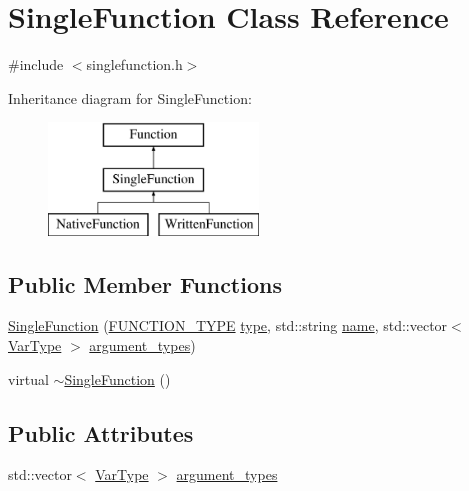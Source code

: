 \hypertarget{classSingleFunction}{}\section{Single\+Function Class Reference}
\label{classSingleFunction}


{\ttfamily \#include $<$singlefunction.\+h$>$}

Inheritance diagram for Single\+Function\+:\begin{figure}[H]
\begin{center}
\leavevmode
\includegraphics[height=3.000000cm]{classSingleFunction}
\end{center}
\end{figure}
\subsection*{Public Member Functions}
\begin{DoxyCompactItemize}
\item 
\hyperlink{classSingleFunction_a8c6cc400a8f83f317fa62de6886fde40}{Single\+Function} (\hyperlink{statics_8h_a025d9866e39f51183a23b3e2165f0e77}{F\+U\+N\+C\+T\+I\+O\+N\+\_\+\+T\+Y\+PE} \hyperlink{classFunction_a07d7969dbcf44a6a066c6e042a02983d}{type}, std\+::string \hyperlink{classFunction_a161d1ceb4f67f3222caf429fea7b71f1}{name}, std\+::vector$<$ \hyperlink{classVarType}{Var\+Type} $>$ \hyperlink{classSingleFunction_a345cc7c6a42587a62495688af6644a26}{argument\+\_\+types})
\item 
virtual \hyperlink{classSingleFunction_ae414926a60c49b4039e7cd41a304ed77}{$\sim$\+Single\+Function} ()
\end{DoxyCompactItemize}
\subsection*{Public Attributes}
\begin{DoxyCompactItemize}
\item 
std\+::vector$<$ \hyperlink{classVarType}{Var\+Type} $>$ \hyperlink{classSingleFunction_a345cc7c6a42587a62495688af6644a26}{argument\+\_\+types}
\end{DoxyCompactItemize}


